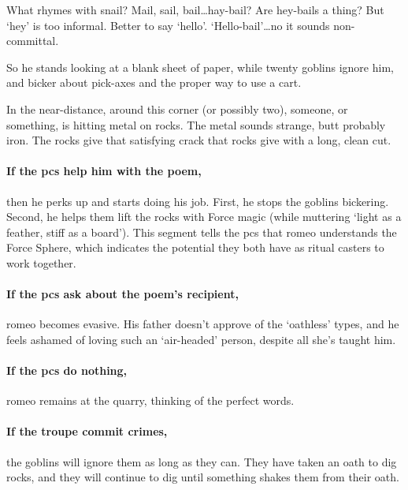 \begin{multicols}{2}
\begin{speechtext}
  What rhymes with snail?
  Mail, sail, bail\ldots hay-bail?
  Are hey-bails a thing?
  But `hey' is too informal.
  Better to say `hello'.
  `Hello-bail'\ldots no it sounds non-committal.
\end{speechtext}

So he stands looking at a blank sheet of paper, while twenty goblins ignore him, and bicker about pick-axes and the proper way to use a cart.

\begin{boxtext}
  In the near-distance, around this corner (or possibly two), someone, or something, is hitting metal on rocks.
  The metal sounds strange, butt probably iron.
  The rocks give that satisfying crack that rocks give with a long, clean cut.
\end{boxtext}

\paragraph{If the \glspl{pc} help him with the poem,}
then he perks up and starts doing his job.
First, he stops the goblins bickering.
Second, he helps them lift the rocks with Force magic (while muttering `light as a feather, stiff as a board').
This \gls{segment} tells the \glspl{pc} that \gls{romeo} understands the Force Sphere, which indicates the potential they both have as ritual casters to work together.

\paragraph{If the \glspl{pc} ask about the poem's recipient,}
\gls{romeo} becomes evasive.
His father doesn't approve of the `oathless' types, and he feels ashamed of loving such an `air-headed' person, despite all she's taught him.

\paragraph{If the \glspl{pc} do nothing,}
\gls{romeo} remains at the quarry, thinking of the perfect words.

\paragraph{If the troupe commit crimes,}
the goblins will ignore them as long as they can.
They have taken an oath to dig rocks, and they will continue to dig until something shakes them from their oath.



\end{multicols}
